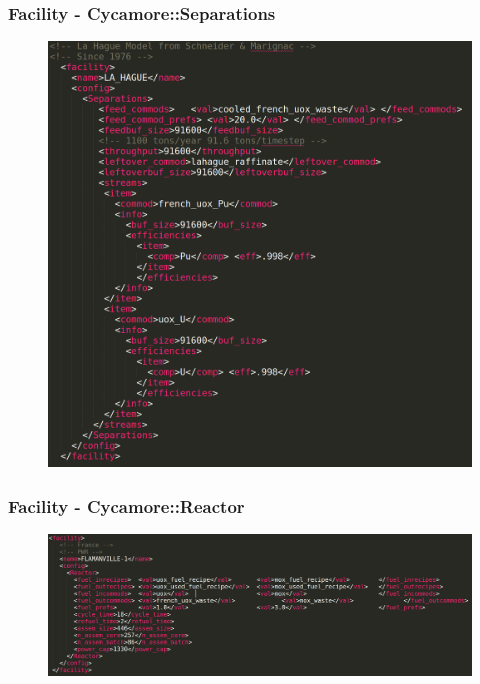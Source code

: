 \begin{frame}
    \frametitle{Facility - Cycamore::Separations}
\begin{figure}[htbp!]
        \begin{center}
                \includegraphics[width=.7\textwidth]{./images/lahague.png}
        \end{center}
    \end{figure}

\end{frame}

\begin{frame}
    \frametitle{Facility - Cycamore::Reactor}
\begin{figure}[htbp!]
        \begin{center}
                \includegraphics[width=1.1\textwidth]{./images/flamanville.png}
        \end{center}
    \end{figure}

\end{frame}


